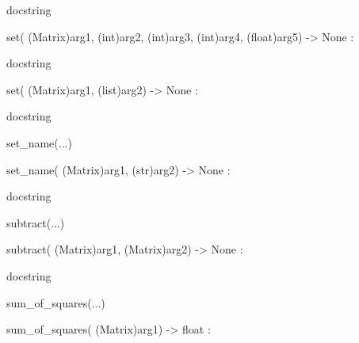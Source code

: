 \documentclass[letterpaper,10pt,english]{sphinxmanual}
\begin{document}
\begin{description}
\begin{description}
\begin{DUlineblock}{0em}
\begin{DUlineblock}{\DUlineblockindent}
\begin{DUlineblock}{\DUlineblockindent}
\item[] docstring
\item[] 
\end{DUlineblock}
\item[] set( (Matrix)arg1, (int)arg2, (int)arg3, (int)arg4, (float)arg5) -\textgreater{} None :
\item[]
\begin{DUlineblock}{\DUlineblockindent}
\item[] docstring
\item[] 
\end{DUlineblock}
\item[] set( (Matrix)arg1, (list)arg2) -\textgreater{} None :
\item[]
\begin{DUlineblock}{\DUlineblockindent}
\item[] docstring
\item[] 
\end{DUlineblock}
\end{DUlineblock}
\item[] set\_name(...)
\item[]
\begin{DUlineblock}{\DUlineblockindent}
\item[] set\_name( (Matrix)arg1, (str)arg2) -\textgreater{} None :
\item[]
\begin{DUlineblock}{\DUlineblockindent}
\item[] docstring
\item[] 
\end{DUlineblock}
\end{DUlineblock}
\item[] subtract(...)
\item[]
\begin{DUlineblock}{\DUlineblockindent}
\item[] subtract( (Matrix)arg1, (Matrix)arg2) -\textgreater{} None :
\item[]
\begin{DUlineblock}{\DUlineblockindent}
\item[] docstring
\item[] 
\end{DUlineblock}
\end{DUlineblock}
\item[] sum\_of\_squares(...)
\item[]
\begin{DUlineblock}{\DUlineblockindent}
\item[] sum\_of\_squares( (Matrix)arg1) -\textgreater{} float :

\end{DUlineblock}
\end{DUlineblock}
\end{description}
\end{description}
\end{document}
